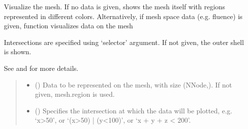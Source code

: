 \documentclass[letterpaper,10pt,english]{sphinxmanual}
\begin{document}
\begin{fulllineitems}
\begin{fulllineitems}
\label{\detokenize{_autosummary/nirfasterff.base.stnd_mesh.stndmesh:nirfasterff.base.stnd_mesh.stndmesh.plot}}
\pysigstartsignatures
\pysiglinewithargsret
{}
{\sphinxparamcomma {}\sphinxparamcomma {}\sphinxparamcomma {}\sphinxparamcomma {}}
{}
\pysigstopsignatures
\sphinxAtStartPar
Visualize the mesh. If no data is given, shows the mesh itself with regions represented in different colors.
Alternatively, if mesh space data (e.g. fluence) is given, function visualizes data on the mesh

\sphinxAtStartPar
Intersections are specified using ‘selector’ argument. If not given, the outer shell is shown.

\sphinxAtStartPar
See {\hyperref[\detokenize{_autosummary/nirfasterff.visualize.plotimage:nirfasterff.visualize.plotimage}]{}} and {\hyperref[\detokenize{_autosummary/nirfasterff.visualize.plot3dmesh_v2:nirfasterff.visualize.plot3dmesh_v2}]{}} for more details.
\begin{quote}\begin{description}
\begin{itemize}
\item {} 
\sphinxAtStartPar
{} (\sphinxstyleliteralemphasis{\sphinxupquote{, }}) \textendash{} Data to be represented on the mesh, with size (NNode,). If not given, mesh.region is used.

\item {} 
\sphinxAtStartPar
{} (\sphinxstyleliteralemphasis{\sphinxupquote{, }}) \textendash{} 
\sphinxAtStartPar
Specifies the intersection at which the data will be plotted, e.g. ‘x\textgreater{}50’, or ‘(x\textgreater{}50) | (y\textless{}100)’, or ‘x + y + z \textless{} 200’.


\end{itemize}
\end{description}
\end{quote}
\end{fulllineitems}
\end{fulllineitems}
\end{document}
